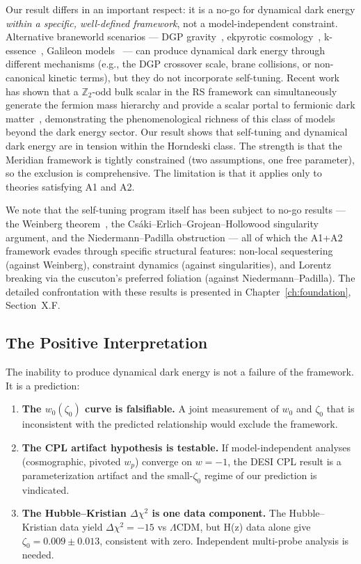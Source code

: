 Our result differs in an important respect: it is a no-go for dynamical dark energy \emph{within a specific, well-defined framework}, not a model-independent constraint. Alternative braneworld scenarios --- DGP gravity~\cite{ch3:dgp2000}, ekpyrotic cosmology~\cite{ch3:khoury2001}, k-essence~\cite{ch3:kessence2000}, Galileon models~\cite{ch3:nicolis2009} --- can produce dynamical dark energy through different mechanisms (e.g., the DGP crossover scale, brane collisions, or non-canonical kinetic terms), but they do not incorporate self-tuning. Recent work has shown that a $\mathbb{Z}_2$-odd bulk scalar in the RS framework can simultaneously generate the fermion mass hierarchy and provide a scalar portal to fermionic dark matter~\cite{ch3:CarmonaEtAl2021}, demonstrating the phenomenological richness of this class of models beyond the dark energy sector. Our result shows that self-tuning and dynamical dark energy are in tension within the Horndeski class. The strength is that the Meridian framework is tightly constrained (two assumptions, one free parameter), so the exclusion is comprehensive. The limitation is that it applies only to theories satisfying A1 and A2.

We note that the self-tuning program itself has been subject to no-go results --- the Weinberg theorem~\cite{ch3:weinberg1989}, the Cs\'aki--Erlich--Grojean--Hollowood singularity argument, and the Niedermann--Padilla obstruction --- all of which the A1+A2 framework evades through specific structural features: non-local sequestering (against Weinberg), constraint dynamics (against singularities), and Lorentz breaking via the cuscuton's preferred foliation (against Niedermann--Padilla). The detailed confrontation with these results is presented in Chapter~\ref{ch:foundation}, Section~X.F.

\subsection{The Positive Interpretation}
\label{sec:3-positive}

The inability to produce dynamical dark energy is not a failure of the framework. It is a prediction:

\begin{enumerate}
  \item \textbf{The $w_0(\zeta_0)$ curve is falsifiable.} A joint measurement of $w_0$ and $\zeta_0$ that is inconsistent with the predicted relationship would exclude the framework.
  \item \textbf{The CPL artifact hypothesis is testable.} If model-independent analyses (cosmographic, pivoted $w_p$) converge on $w = -1$, the DESI CPL result is a parameterization artifact and the small-$\zeta_0$ regime of our prediction is vindicated.
  \item \textbf{The Hubble--Kristian $\Delta\chi^2$ is one data component.} The Hubble--Kristian data yield $\Delta\chi^2 = -15$ vs $\Lambda$CDM, but H(z) data alone give $\zeta_0 = 0.009 \pm 0.013$, consistent with zero. Independent multi-probe analysis is needed.
\end{enumerate}

